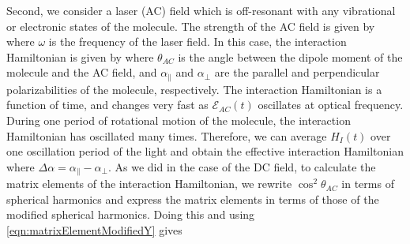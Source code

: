 Second, we consider a  laser (AC) field which is off-resonant with any vibrational or electronic states 
of the molecule. The strength of the AC field  is given by 
where $\omega$ is the frequency of the laser field. In this case, the interaction Hamiltonian is given by \cite{friedrich-95}
where $\theta_{AC}$ is the angle between the dipole moment of the molecule and the AC field, and $\alpha_\|$ and
$\alpha_{\perp}$ are the parallel and perpendicular polarizabilities of the molecule, respectively.  
The interaction Hamiltonian is a function of time, and changes very fast as $\mathcal{E}_{ AC} (t)$ oscillates at optical 
frequency.
During one period of rotational motion of the molecule, the interaction Hamiltonian has oscillated many times. 
Therefore, we can average $H_{I}(t)$ over one oscillation period of the light and obtain the effective interaction
 Hamiltonian
where $\Delta \alpha = \alpha_{\parallel} - \alpha_{\perp}$. 
As we did in the case of the DC field, to calculate the matrix elements of the interaction Hamiltonian, we rewrite 
$\cos^2\theta_{AC}$ in terms of spherical harmonics  and express the matrix elements in terms of those of the modified spherical harmonics. Doing this and using \autoref{eqn:matrixElementModifiedY} gives


